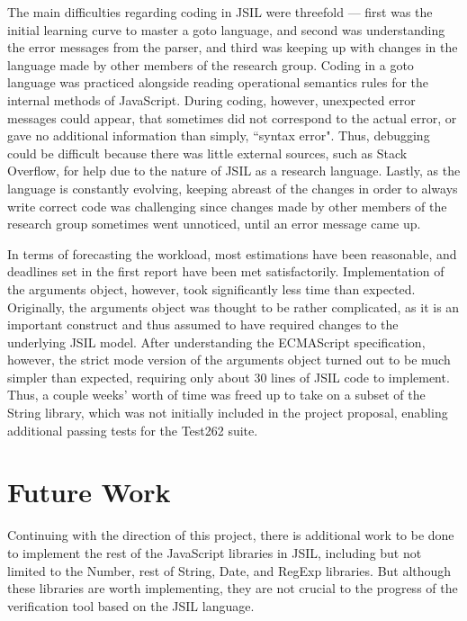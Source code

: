 \documentclass[a4paper,11pt,twoside]{report}
\begin{document}
The main difficulties regarding coding in JSIL were threefold --- first was the initial learning curve to master a goto language, and second was understanding the error messages from the parser, and third was keeping up with changes in the language made by other members of the research group. Coding in a goto language was practiced alongside reading operational semantics rules for the internal methods of JavaScript. During coding, however, unexpected error messages could appear, that sometimes did not correspond to the actual error, or gave no additional information than simply, ``syntax error". Thus, debugging could be difficult because there was little external sources, such as Stack Overflow, for help due to the nature of JSIL as a research language. Lastly, as the language is constantly evolving, keeping abreast of the changes in order to always write correct code was challenging since changes made by other members of the research group sometimes went unnoticed, until an error message came up. 

In terms of forecasting the workload, most estimations have been reasonable, and deadlines set in the first report have been met satisfactorily. Implementation of the arguments object, however, took significantly less time than expected. Originally, the arguments object was thought to be rather complicated, as it is an important construct and thus assumed to have required changes to the underlying JSIL model. After understanding the ECMAScript specification, however, the strict mode version of the arguments object turned out to be much simpler than expected, requiring only about 30 lines of JSIL code to implement. Thus, a couple weeks' worth of time was freed up to take on a subset of the String library, which was not initially included in the project proposal, enabling additional passing tests for the Test262 suite.

\section{Future Work}
Continuing with the direction of this project, there is additional work to be done to implement the rest of the JavaScript libraries in JSIL, including but not limited to the Number, rest of String, Date, and RegExp libraries. But although these libraries are worth implementing, they are not crucial to the progress of the verification tool based on the JSIL language.
\end{document}
